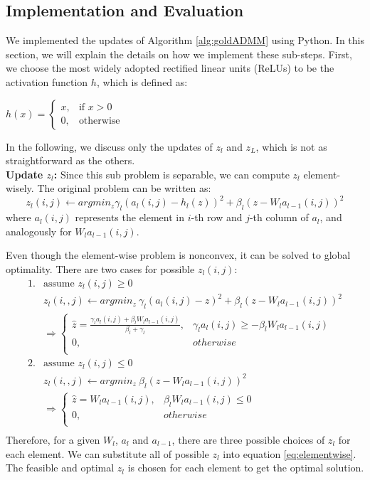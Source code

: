 \documentclass[letterpaper, 10 pt, conference]{ieeeconf}  %
\begin{document}
\subsection{Implementation and Evaluation}
We implemented the updates of  Algorithm \ref{alg:goldADMM} using Python. In this section, we will explain the details on how we implement these sub-steps. First, we choose the most widely adopted rectified linear units (ReLUs) to be the activation function $h$, which is defined as:
\begin{center}
$h(x) = \begin{cases} x, & \mbox{if } x> 0 \\0, & \mbox{otherwise }\end{cases} $
\end{center}

In the following, we discuss only the updates of $z_l$ and $z_L$, which is not as straightforward as the others.\\
\textbf{Update $z_l$:  } Since this sub problem is separable, we can compute $z_l$ element-wisely. The original problem can be written as:
\begin{equation}
z_l(i,j) \gets argmin_z \gamma_l(a_l(i,j)-h_l(z))^2 + \beta_l(z-W_la_{l-1}(i,j))^2
\label{eq:elementwise}
\end{equation}
where $a_l(i,j)$ represents the element in $i$-th row and $j$-th column of $a_l$, and analogously for $W_la_{l-1}(i,j)$.

Even though the element-wise problem is nonconvex, it can be solved to global optimality. There are two cases for possible $z_l(i,j)$:
\begin{equation}
\begin{aligned}
1. & \text{assume } z_l(i,j) \geq 0 \\
& z_l(i,,j) \gets argmin_z ~\gamma_l(a_l(i,j)-z)^2 + \beta_l(z-W_la_{l-1}(i,j))^2\\
& \Rightarrow \left\{
\begin{array}{ll}
      \widehat{z} = \frac{\gamma_la_l(i,j)+\beta_lW_la_{l-1}(i,j)}{\beta_l+\gamma_l}, & \gamma_la_l(i,j)\geq -\beta_lW_la_{l-1}(i,j)\\
      0, & otherwise \\
\end{array} 
\right. \\
2. &  \text{assume } z_l(i,j) \leq 0 \\
& z_l(i,,j) \gets argmin_z ~\beta_l(z-W_la_{l-1}(i,j))^2\\
& \Rightarrow \left\{
\begin{array}{ll}
      \widehat{z} = W_la_{l-1}(i,j), & \beta_lW_la_{l-1}(i,j) \leq 0\\
      0, & otherwise \\
\end{array} 
\right. \\
\end{aligned}
\end{equation}
Therefore, for a given $W_l$, $a_l$ and $a_{l-1}$, there are three possible choices of $z_l$ for each element. We can substitute all of possible $z_l$ into equation \eqref{eq:elementwise}. The feasible and optimal $z_l$ is chosen for each element to get the optimal solution.
\end{document}

